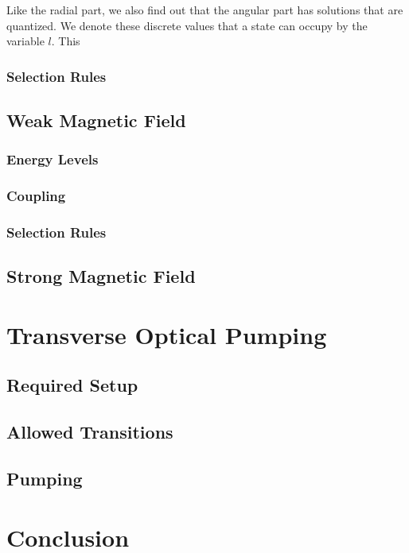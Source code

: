 \documentclass[letter,12pt]{article}
\begin{document}
        Like the radial part, 
        we also find out that the angular part has solutions that 
        are quantized. We denote these discrete values that a state
		can occupy by the variable $l$. This 

        \label{angularMomentum}
		\subsubsection{Selection Rules}\label{selectionRules}

	\subsection{Weak Magnetic Field}
		\subsubsection{Energy Levels}
		\subsubsection{Coupling}
		\subsubsection{Selection Rules}

	\subsection{Strong Magnetic Field}

\section{Transverse Optical Pumping}

	\subsection{Required Setup}

	\subsection{Allowed Transitions}

	\subsection{Pumping}

\section{Conclusion}
\end{document}
